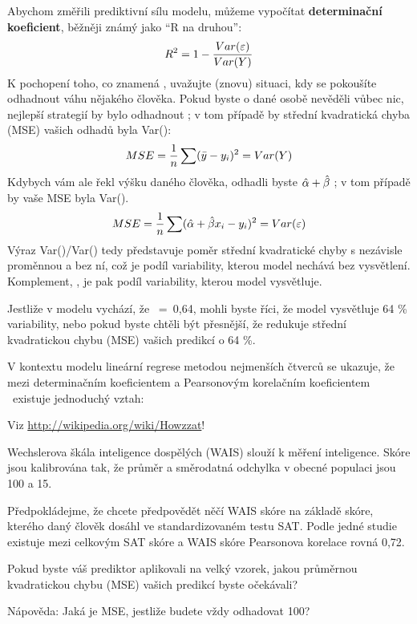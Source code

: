 \documentclass[12pt]{book}
\begin{document}
Abychom změřili prediktivní sílu modelu, můžeme vypočítat {\bf
  determinační koeficient}, běžněji známý jako ``R na druhou'':
%
\[ R^2 = 1 - \frac{Var(\varepsilon)}{Var(Y)}\]
%
K pochopení toho, co znamená \R{}, uvažujte (znovu) situaci, kdy se pokoušíte odhadnout váhu nějakého člověka. Pokud byste o dané osobě nevěděli vůbec nic, nejlepší strategií by bylo odhadnout \myybar; v tom případě by střední kvadratická chyba (MSE) vašich odhadů byla Var(\Y):
%
\[ MSE = \frac{1}{n} \sum (\bar{y} - y_i)^2 = Var(Y) \]
%
Kdybych vám ale řekl výšku daného člověka, odhadli byste $\hat{\alpha} +
\hat{\beta}$ \x{}; v tom případě by vaše MSE byla Var(\myeps).
%
\[ MSE =
\frac{1}{n} \sum (\hat{\alpha} + \hat{\beta} x_i - y_i)^2 =
Var(\varepsilon) \]
%
Výraz Var(\myeps)/Var(\Y) tedy představuje poměr střední kvadratické chyby s nezávisle proměnnou a bez ní, což je podíl variability, kterou model nechává bez vysvětlení. Komplement, \R{},
je pak podíl variability, kterou model vysvětluje.

Jestliže v modelu vychází, že \R{}~=~0,64, mohli byste říci, že model vysvětluje
64 \% variability, nebo pokud byste chtěli být přesnější, že redukuje střední kvadratickou chybu (MSE) vašich predikcí o 64 \%.

V kontextu modelu lineární regrese metodou nejmenších čtverců se ukazuje, že mezi determinačním koeficientem a Pearsonovým korelačním koeficientem \myrho~existuje jednoduchý vztah:


Viz \url{http://wikipedia.org/wiki/Howzzat}!

\begin{exercise}
Wechslerova škála inteligence dospělých (WAIS) slouží k měření inteligence. Skóre jsou kalibrována tak, že průměr a směrodatná odchylka v obecné populaci jsou 100 a 15.

Předpokládejme, že chcete předpovědět něčí WAIS skóre na základě skóre, kterého daný člověk dosáhl ve standardizovaném testu SAT. Podle jedné studie existuje mezi celkovým SAT skóre a WAIS skóre Pearsonova korelace rovná
0,72.

Pokud byste váš prediktor aplikovali na velký vzorek, jakou průměrnou kvadratickou chybu (MSE) vašich predikcí byste očekávali?

Nápověda: Jaká je MSE, jestliže budete vždy odhadovat 100?
\end{exercise}
\end{document}
